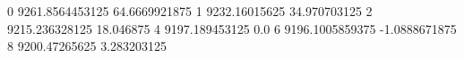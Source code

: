 0 9261.8564453125 64.6669921875
1 9232.16015625 34.970703125
2 9215.236328125 18.046875
4 9197.189453125 0.0
6 9196.1005859375 -1.0888671875
8 9200.47265625 3.283203125
